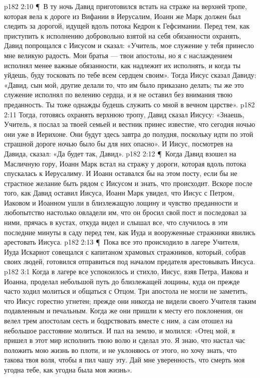 \vs p182 2:10 \P\ В ту ночь Давид приготовился встать на страже на верхней тропе, которая вела к дороге из Вифании в Иерусалим, Иоанн же Марк должен был следить за дорогой, идущей вдоль потока Кедрон к Гефсимании. Перед тем, как приступить к исполнению добровольно взятой на себя обязанности охранять, Давид попрощался с Иисусом и сказал: «Учитель, мое служение у тебя принесло мне великую радость. Мои братья --- твои апостолы, но я с наслаждением исполнял менее важные обязанности, как надлежит их исполнять, и когда ты уйдешь, буду тосковать по тебе всем сердцем своим». Тогда Иисус сказал Давиду: «Давид, сын мой, другие делали то, что им было приказано делать; ты же это служение исполнял по велению сердца, и я не оставил без внимания твою преданность. Ты тоже однажды будешь служить со мной в вечном царстве».
\vs p182 2:11 Тогда, готовясь охранять верхнюю тропу, Давид сказал Иисусу: «Знаешь, Учитель, я послал за твоей семьей и вестник принес известие, что сегодня ночью они уже в Иерихоне. Они будут здесь завтра до полудня, поскольку идти по этой страшной дороге ночью было бы для них опасно». И Иисус, посмотрев на Давида, сказал: «Да будет так, Давид».
\vs p182 2:12 \P\ Когда Давид взошел на Масличную гору, Иоанн Марк встал на стражу у дороги, которая вдоль потока спускалась к Иерусалиму. И Иоанн оставался бы на этом посту, если бы не страстное желание быть рядом с Иисусом и знать, что происходит. Вскоре после того, как Давид оставил Иисуса, Иоанн Марк увидел, что Иисус с Петром, Иаковом и Иоанном ушли в близлежащую лощину и чувство преданности и любопытство настолько овладели им, что он бросил свой пост и последовал за ними, прячась в кустах, откуда видел и слышал все, что случилось в эти последние минуты в саду перед тем, как Иуда и вооруженные стражники явились арестовать Иисуса.
\vs p182 2:13 \P\ Пока все это происходило в лагере Учителя, Иуда Искариот совещался с капитаном храмовых стражников, который, собрав своих людей, готовился отправиться под началом предателя арестовывать Иисуса.
\vs p182 3:1 Когда в лагере все успокоилось и стихло, Иисус, взяв Петра, Иакова и Иоанна, проделал небольшой путь до близлежащей лощины, куда он прежде часто ходил молиться и общаться с Отцом. Три апостола не могли не заметить, что Иисус горестно угнетен; прежде они никогда не видели своего Учителя таким подавленным и печальным. Когда же они пришли к месту его поклонения, он велел трем апостолам сесть и бодрствовать вместе с ним, а сам отошел на небольшое расстояние молиться. И пал на землю, и молился: «Отец мой, я пришел в этот мир исполнить твою волю и сделал это. Я знаю, что настал час положить мою жизнь во плоти, и не уклоняюсь от этого, но хочу знать, что такова твоя воля, чтобы я пил чашу эту. Дай мне уверенность, что смерть моя угодна тебе, как угодна была моя жизнь».
